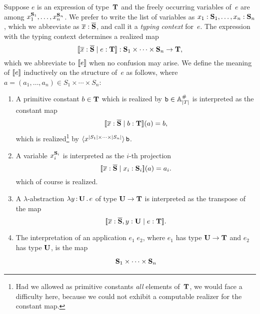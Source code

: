 Suppose $e$ is an expression of type~$\mathbf{T}$ and the freely
occurring variables of~$e$ are among $x_1^{\mathbf{S}_1}, \ldots,
x_n^{\mathbf{S}_n}$. We prefer to write the list of variables as
$x_1 : \mathbf{S}_1, \ldots, x_n : \mathbf{S}_n$, which we abbreviate as
$\overline{x} : \overline{\mathbf{S}}$, and call it a \emph{typing
  context} for~$e$. The expression with the typing context determines
a realized map
%
\begin{equation*}
  [\![\overline{x} : \overline{\mathbf{S}} \mid e : \mathbf{T}]\!] :
  \mathbf{S}_1 \times \cdots \times \mathbf{S}_n \to \mathbf{T},
\end{equation*}
%
which we abbreviate to $[\![e]\!]$ when no confusion may arise. We
define the meaning of $[\![e]\!]$ inductively on the structure of~$e$ as
follows, where $a = (a_1, \ldots, a_n) \in S_1 \times \cdots \times
S_n$:
%
\begin{enumerate}
\item A primitive constant $b \in \mathbf{T}$ which is realized by $\mathtt{b}
  \in \mathbb{A}^{\#}_{|T|}$ is interpreted as the constant map
  \begin{equation*}
    [\![\overline{x} : \overline{\mathbf{S}} \mid b : \mathbf{T}]\!](a) = b,
  \end{equation*}
  which is realized\footnote{Had we allowed as primitive constants
    \emph{all} elements of~$\mathbf{T}$, we would face a difficulty here,
    because we could not exhibit a computable realizer for the
    constant map.} by $\langle x^{|S_1| \times \cdots \times
      |S_n|} \rangle\,\mathtt{b}$.
\item A variable $x_i^{\mathbf{S}_i}$ is interpreted as the $i$-th
  projection
  \begin{equation*}
    [\![\overline{x} : \overline{\mathbf{S}} \mid x_i : \mathbf{S}_i]\!](a) = a_i.
  \end{equation*}
  which of course is realized.
\item A $\lambda$-abstraction $\lambda y \,{:}\, \mathbf{U}\,.\,e$ of type $\mathbf{U}
  \to \mathbf{T}$ is interpreted as the transpose of the map
  \begin{equation*}
    [\![\overline{x} : \overline{\mathbf{S}}, y : \mathbf{U} \mid e : \mathbf{T}]\!].
  \end{equation*}
\item The interpretation of an application $e_1\;e_2$, where $e_1$ has
  type $\mathbf{U} \to \mathbf{T}$ and $e_2$ has type $\mathbf{U}$, is the map
  \begin{equation*}
    \xymatrix@+2em{
      **[l]{\asm{S}_1 \times \cdots \times \asm{S}_n}
}
\end{equation*}
\end{enumerate}
